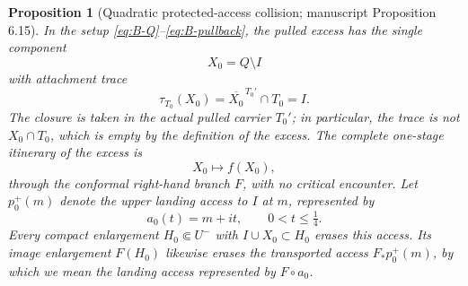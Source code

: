 \documentclass[11pt,reqno]{amsart}
\newtheorem{proposition}[theorem]{Proposition}
\theoremstyle{definition}
\theoremstyle{remark}
\begin{document}
\begin{proposition}[Quadratic protected-access collision; manuscript Proposition 6.15]\label{prop:access-collision}
In the setup \eqref{eq:B-Q}--\eqref{eq:B-pullback}, the pulled excess has the
single component
\[
X_0=Q\setminus I
\]
with attachment trace
\[
\tau_{T_0}(X_0)=\overline{X_0}^{\,T_0'}\cap T_0=I .
\]
The closure is taken in the actual pulled carrier $T_0'$; in particular, the
trace is not $X_0\cap T_0$, which is empty by the definition of the excess.
The complete one-stage itinerary of the excess is
\[
X_0\longmapsto f(X_0),
\]
through the conformal right-hand branch $F$, with no critical encounter.
Let $p_0^{+}(m)$ denote the upper landing access to $I$ at $m$, represented
by
\[
a_0(t)=m+it,\qquad 0<t\le\tfrac14.
\]
Every compact enlargement $H_0\Subset U^{-}$ with
$I\cup X_0\subset H_0$ erases this access.  Its image enlargement
$F(H_0)$ likewise erases the transported access
$F_*p_0^{+}(m)$, by which we mean the landing access represented by
$F\circ a_0$.
\end{proposition}
\end{document}
